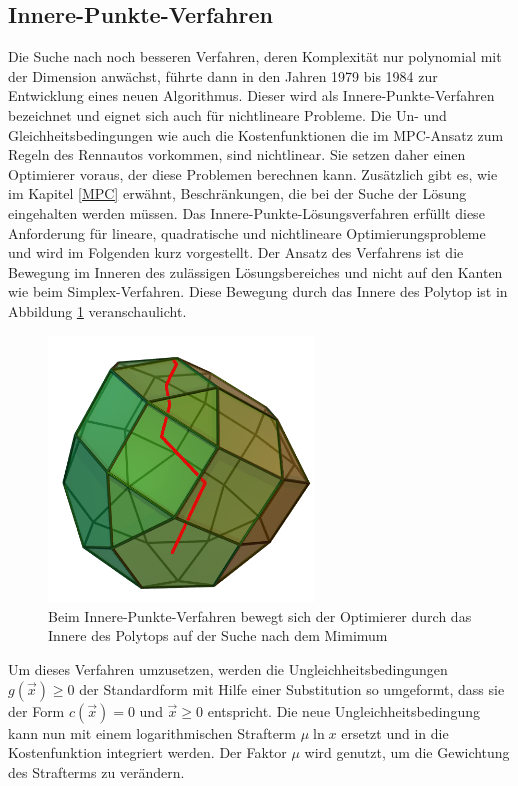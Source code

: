 \documentclass{like}
\begin{document}
\subsection{Innere-Punkte-Verfahren} 
\label{ipm} 
Die Suche nach noch besseren Verfahren, deren Komplexität nur polynomial mit der Dimension anwächst, führte dann in den Jahren 1979 bis 1984 zur Entwicklung eines neuen Algorithmus. Dieser wird als Innere-Punkte-Verfahren bezeichnet und eignet sich auch für nichtlineare Probleme. Die Un- und Gleichheitsbedingungen wie auch die Kostenfunktionen die im \ac{MPC}-Ansatz zum Regeln des Rennautos vorkommen, sind nichtlinear. Sie setzen daher einen Optimierer voraus, der diese Problemen berechnen kann. Zusätzlich gibt es, wie im Kapitel \ref{MPC} erwähnt, Beschränkungen, die bei der Suche der Lösung eingehalten werden müssen. Das Innere-Punkte-Lösungsverfahren erfüllt diese Anforderung für lineare, quadratische und nichtlineare Optimierungsprobleme und wird im Folgenden kurz vorgestellt. Der Ansatz des Verfahrens ist die Bewegung im Inneren des zulässigen Lösungsbereiches und nicht auf den Kanten wie beim Simplex-Verfahren. Diese Bewegung durch das Innere des Polytop ist in Abbildung \ref{fig:iterPointMethod} veranschaulicht.  
\begin{figure}[ht!]
	\centering
	\includegraphics[width=200pt]{Abbildungen/iterPointMethod.png}
	\caption{Beim Innere-Punkte-Verfahren bewegt sich der Optimierer durch das Innere des Polytops auf der Suche nach dem Mimimum}
	\label{fig:iterPointMethod}
\end{figure}

Um dieses Verfahren umzusetzen, werden die Ungleichheitsbedingungen $g(\vec{x}) \geq 0$ der Standardform mit Hilfe einer Substitution so umgeformt, dass sie der Form $c(\vec{x}) = 0$ und $\vec{x} \geq  0$ entspricht. Die neue Ungleichheitsbedingung kann nun mit einem logarithmischen Strafterm $ \mu \ln x $  ersetzt und in die Kostenfunktion integriert werden. 
Der Faktor $\mu$ wird genutzt, um die Gewichtung des Strafterms zu verändern.
\end{document}

